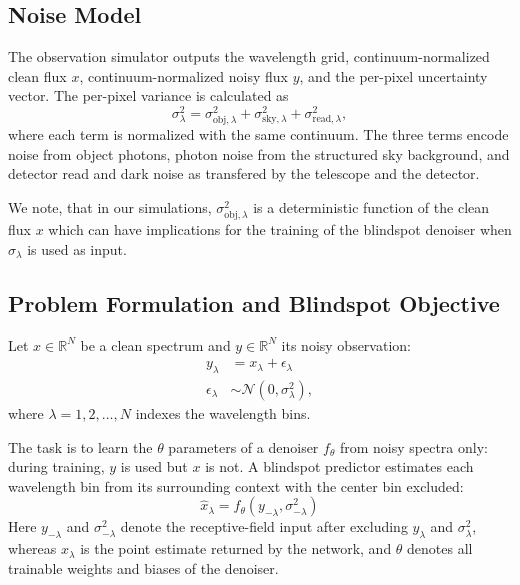 \documentclass[twocolumn]{aastex7}
\begin{document}
\subsection{Noise Model}
The observation simulator outputs the wavelength grid, continuum-normalized clean flux $x$, continuum-normalized noisy flux $y$, and the per-pixel uncertainty vector. The per-pixel variance is calculated as
\begin{equation}
    \sigma_{\lambda}^{2}
    =
    \sigma_{\mathrm{obj},\lambda}^{2}
    +
    \sigma_{\mathrm{sky},\lambda}^{2}
    +
    \sigma_{\mathrm{read},\lambda}^{2},
    \label{eq:noise_components}
\end{equation}
where each term is normalized with the same continuum.
The three terms encode noise from object photons, photon noise from the structured sky background, and detector read and dark noise as transfered by the telescope and the detector.

We note, that in our simulations, $\sigma_{\mathrm{obj},\lambda}^2$ is a deterministic function of the clean flux $x$ which can have implications for the training of the blindspot denoiser when $\sigma_{\lambda}$ is used as input.

\subsection{Problem Formulation and Blindspot Objective}
\label{sec:problem_formulation}

Let $x\in\mathbb{R}^{N}$ be a clean spectrum and $y\in\mathbb{R}^{N}$ its noisy observation:
\begin{align}
    y_{\lambda} &= x_{\lambda} + \epsilon_{\lambda} \\[1em]
    \epsilon_{\lambda} &\sim \mathcal{N}(0,\sigma_{\lambda}^{2}),
    \label{eq:noise_model_scalar}
\end{align}
where $\lambda = 1,2,\dots, N$ indexes the wavelength bins.

The task is to learn the $\theta$ parameters of a denoiser $f_\theta$ from noisy spectra only: during training, $y$ is used but $x$ is not. A blindspot predictor estimates each wavelength bin from its surrounding context with the center bin excluded:
\begin{equation}
    \hat{x}_{\lambda}
        = f_{\theta}(y_{-\lambda},\sigma_{-\lambda}^2)
\end{equation}
Here $y_{-\lambda}$ and $\sigma_{-\lambda}^2$ denote the receptive-field input after excluding $y_{\lambda}$ and $\sigma_{\lambda}^2$, whereas $\hat{x}_{\lambda}$ is the point estimate returned by the network, and $\theta$ denotes all trainable weights and biases of the denoiser.
\end{document}
